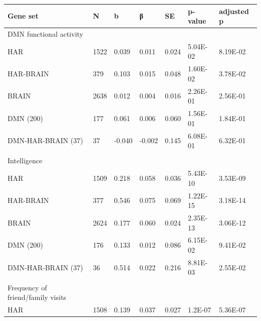 \begin{refsection}
\begin{table}[H]
\small
{}\selectfont
{} \label{table3S7} 
\centering
\begin{tabular}{@{}lllllll@{}}
\hline
Gene set                          & N    & b      & β      & SE    & p-value  & adjusted p \\ \hline
DMN functional activity           &      &        &        &       &          &            \\
HAR                               & 1522 & 0.039  & 0.011  & 0.024 & 5.04E-02 & 8.19E-02   \\
HAR-BRAIN                         & 379  & 0.103  & 0.015  & 0.048 & 1.60E-02 & 3.78E-02   \\
BRAIN                             & 2638 & 0.012  & 0.004  & 0.016 & 2.26E-01 & 2.56E-01   \\
DMN (200)                         & 177  & 0.061  & 0.006  & 0.060 & 1.56E-01 & 1.84E-01   \\
DMN-HAR-BRAIN (37)                & 37   & -0.040 & -0.002 & 0.145 & 6.08E-01 & 6.32E-01   \\
                                  &      &        &        &       &          &            \\
Intelligence                      &      &        &        &       &          &            \\
HAR                               & 1509 & 0.218  & 0.058  & 0.036 & 5.43E-10 & 3.53E-09   \\
HAR-BRAIN                         & 377  & 0.546  & 0.075  & 0.069 & 1.22E-15 & 3.18E-14   \\
BRAIN                             & 2624 & 0.177  & 0.060  & 0.024 & 2.35E-13 & 3.06E-12   \\
DMN (200)                         & 176  & 0.133  & 0.012  & 0.086 & 6.15E-02 & 9.41E-02   \\
DMN-HAR-BRAIN (37)                & 36   & 0.514  & 0.022  & 0.216 & 8.81E-03 & 2.55E-02   \\
                                  &      &        &        &       &          &            \\
Frequency of friend/family visits &      &        &        &       &          &            \\
HAR                               & 1508 & 0.139  & 0.037  & 0.027 & 1.2E-07  & 5.36E-07   \\

\end{tabular}
\end{table}
\end{refsection}

